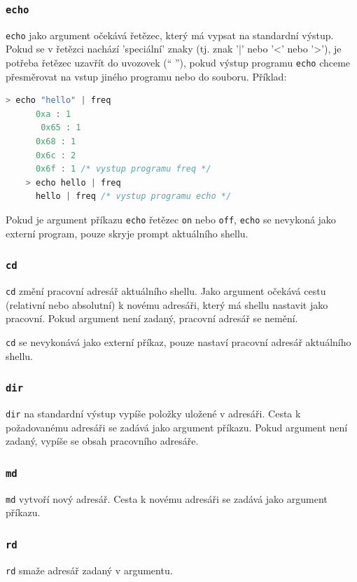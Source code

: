 \documentclass[12pt, a4paper]{article}
\begin{document}
    \subsubsection*{\texttt{echo}}
    \texttt{echo} jako argument očekává řetězec, který má vypsat na standardní výstup. Pokud se v řetězci nachází 'speciální' znaky (tj. znak '|' nebo '<' nebo '>'), je potřeba řetězec uzavřít do uvozovek (`` ''), pokud výstup programu \texttt{echo} chceme přesměrovat na vstup jiného programu nebo do souboru.
    Příklad:
    \begin{lstlisting}[language=C, caption={Ukázka chování programu echo},captionpos=b]
    > echo "hello" | freq
      0xa : 1
	   0x65 : 1
      0x68 : 1
      0x6c : 2
      0x6f : 1 /* vystup programu freq */
    > echo hello | freq
      hello | freq /* vystup programu echo */
    \end{lstlisting}
    
    Pokud je argument příkazu \texttt{echo} řetězec \texttt{on} nebo \texttt{off}, \texttt{echo} se nevykoná jako externí program, pouze skryje prompt aktuálního shellu.
    
    \subsubsection*{\texttt{cd}}
    \texttt{cd} změní pracovní adresář aktuálního shellu. Jako argument očekává cestu (relativní nebo absolutní) k novému adresáři, který má shellu nastavit jako pracovní. Pokud argument není zadaný, pracovní adresář se nemění.
    
    \texttt{cd} se nevykonává jako externí příkaz, pouze nastaví pracovní adresář aktuálního shellu.
    
    \subsubsection*{\texttt{dir}}
    \texttt{dir} na standardní výstup vypíše položky uložené v adresáři. Cesta k požadovanému adresáři se zadává jako argument příkazu. Pokud argument není zadaný, vypíše se obsah pracovního adresáře.
    
    \subsubsection*{\texttt{md}}
    \texttt{md} vytvoří nový adresář. Cesta k novému adresáři se zadává jako argument příkazu.
    
    \subsubsection*{\texttt{rd}}
    \texttt{rd} smaže adresář zadaný v argumentu.
    
\end{document}
